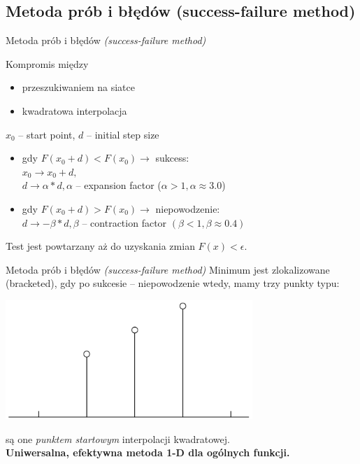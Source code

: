 \subsection{Metoda prób i błędów (success-failure method)}
  \begin{frame}{Metoda prób i błędów \emph{(success-failure method)}}
    \begin{block}{Kompromis między}
      \begin{itemize}
        \item przeszukiwaniem na siatce
        \item kwadratowa interpolacja
      \end{itemize}
    \end{block}
    $x_{0}$ -- start point, $d$ -- initial step size
    \begin{itemize}
      \item gdy $F(x_{0} + d) < F(x_{0}) \to$ sukcess:\\
      $x_{0} \to x_{0} + d,$ \\
      $d \to \alpha * d, \alpha$ -- expansion factor %
      ($\alpha > 1, \alpha \approx 3.0$)
      \item gdy $F(x_{0} + d) > F(x_{0}) \to$ niepowodzenie: \\
      $d \to -\beta * d, \beta$ -- contraction factor
      $(\beta < 1, \beta \approx 0.4)$
    \end{itemize}
    Test jest powtarzany aż do uzyskania zmian $F(x) < \epsilon$.
  \end{frame}

  \begin{frame}{Metoda prób i błędów \emph{(success-failure method)}}
    Minimum jest zlokalizowane (bracketed), gdy po sukcesie
    -- niepowodzenie wtedy, mamy trzy punkty typu:\\ %
    \begin{center}
      \includegraphics[width=0.7\textwidth]{img/17/s-f}
    \end{center}
    są one \emph{punktem startowym} interpolacji kwadratowej.\\
    \textbf{Uniwersalna, efektywna metoda 1-D dla ogólnych funkcji.}
  \end{frame}

